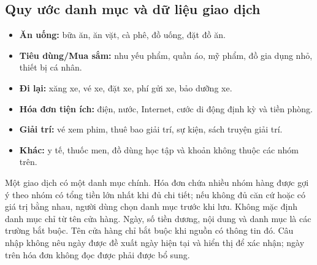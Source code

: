 \documentclass[11pt,a4paper]{article}
\begin{document}
\subsection{Quy ước danh mục và dữ liệu giao dịch}
\begin{itemize}
\item \textbf{Ăn uống:} bữa ăn, ăn vặt, cà phê, đồ uống, đặt đồ ăn.
\item \textbf{Tiêu dùng/Mua sắm:} nhu yếu phẩm, quần áo, mỹ phẩm, đồ gia dụng nhỏ, thiết bị cá nhân.
\item \textbf{Đi lại:} xăng xe, vé xe, đặt xe, phí gửi xe, bảo dưỡng xe.
\item \textbf{Hóa đơn tiện ích:} điện, nước, Internet, cước di động định kỳ và tiền phòng.
\item \textbf{Giải trí:} vé xem phim, thuê bao giải trí, sự kiện, sách truyện giải trí.
\item \textbf{Khác:} y tế, thuốc men, đồ dùng học tập và khoản không thuộc các nhóm trên.
\end{itemize}
Một giao dịch có một danh mục chính. Hóa đơn chứa nhiều nhóm hàng được gợi ý theo nhóm có tổng tiền lớn nhất khi đủ chi tiết; nếu không đủ căn cứ hoặc có giá trị bằng nhau, người dùng chọn danh mục trước khi lưu. Không mặc định danh mục chỉ từ tên cửa hàng. Ngày, số tiền dương, nội dung và danh mục là các trường bắt buộc. Tên cửa hàng chỉ bắt buộc khi nguồn có thông tin đó. Câu nhập không nêu ngày được đề xuất ngày hiện tại và hiển thị để xác nhận; ngày trên hóa đơn không đọc được phải được bổ sung.
\end{document}
